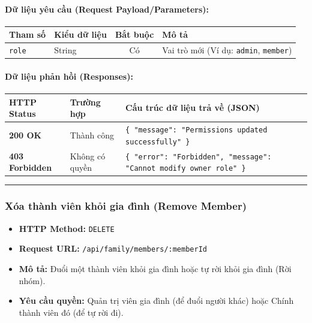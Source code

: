 \documentclass[12pt,a4paper]{article}
\begin{document}
\paragraph{Dữ liệu yêu cầu (Request Payload/Parameters):}
\begin{longtable}{|>{\raggedright\arraybackslash}p{2.8cm}|>{\raggedright\arraybackslash}p{2.2cm}|c|>{\raggedright\arraybackslash}p{7.0cm}|}
\hline
\textbf{Tham số} & \textbf{Kiểu dữ liệu} & \textbf{Bắt buộc} & \textbf{Mô tả} \\ \hline
\endhead
\texttt{role} & String & Có & Vai trò mới (Ví dụ: \texttt{admin}, \texttt{member}) \\ \hline
\end{longtable}

\paragraph{Dữ liệu phản hồi (Responses):}
\begin{longtable}{|>{\raggedright\arraybackslash}p{2.8cm}|>{\raggedright\arraybackslash}p{3.2cm}|>{\raggedright\arraybackslash}p{8.0cm}|}
\hline
\textbf{HTTP Status} & \textbf{Trường hợp} & \textbf{Cấu trúc dữ liệu trả về (JSON)} \\ \hline
\endhead
\textbf{200 OK} & Thành công & \texttt{\{ "message": "Permissions updated successfully" \}} \\ \hline
\textbf{403 Forbidden} & Không có quyền & \texttt{\{ "error": "Forbidden", "message": "Cannot modify owner role" \}} \\ \hline
\end{longtable}

\vskip 0.4cm
\noindent\rule{\textwidth}{0.3pt}
\vskip 0.4cm

\subsubsection{Xóa thành viên khỏi gia đình (Remove Member)}
\begin{itemize}[leftmargin=*]
    \item \textbf{HTTP Method:} \texttt{DELETE}
    \item \textbf{Request URL:} \texttt{/api/family/members/:memberId}
    \item \textbf{Mô tả:} Đuổi một thành viên khỏi gia đình hoặc tự rời khỏi gia đình (Rời nhóm).
    \item \textbf{Yêu cầu quyền:} Quản trị viên gia đình (để đuổi người khác) hoặc Chính thành viên đó (để tự rời đi).
\end{itemize}
\end{document}
